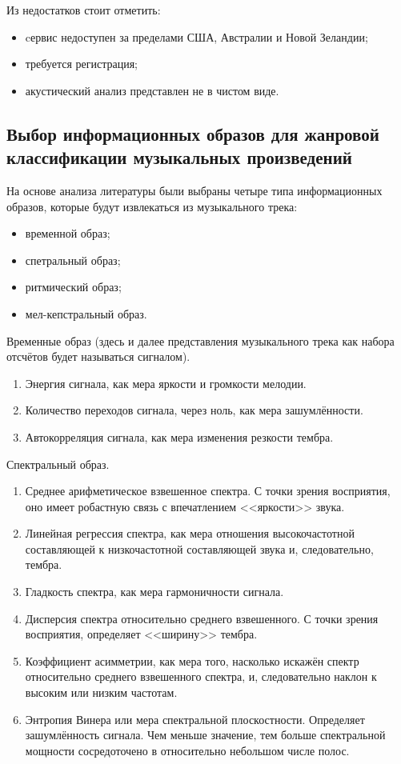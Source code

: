 Из недостатков стоит отметить:
\begin{itemize}
\item cервис недоступен за пределами США, Австралии и Новой Зеландии;
\item требуется регистрация;
\item акустический анализ представлен не в чистом виде.
\end{itemize}



\subsection{Выбор информационных образов для жанровой классификации музыкальных произведений}
\label{sub:domain:feature_selection}
На основе анализа литературы были выбраны четыре типа информационных образов, которые будут извлекаться из музыкального трека:
\begin{itemize}
\item временной образ;
\item спетральный образ;
\item ритмический образ;
\item мел-кепстральный образ.
\end{itemize}

Временные образ (здесь и далее представления музыкального трека как набора отсчётов будет называться сигналом).

\begin{enumerate}[label=\arabic*.]
\item Энергия сигнала, как мера яркости и громкости мелодии.
\item Количество переходов сигнала, через ноль, как мера зашумлённости.
\item Автокорреляция сигнала, как мера изменения резкости тембра.
\end{enumerate}

Спектральный образ.

\begin{enumerate}[label=\arabic*.]
\item Среднее арифметическое взвешенное спектра. С точки зрения восприятия, оно имеет робастную связь с впечатлением <<яркости>> звука.
\item Линейная регрессия спектра, как мера отношения высокочастотной составляющей к низкочастотной составляющей звука и, следовательно, тембра.
\item Гладкость спектра, как мера гармоничности сигнала.
\item Дисперсия спектра относительно среднего взвешенного. С точки зрения восприятия, определяет <<ширину>> тембра.
\item Коэффициент асимметрии, как мера того, насколько искажён спектр относительно среднего взвешенного спектра, и, следовательно наклон к высоким или низким частотам.
\item Энтропия Винера или мера спектральной плоскостности. Определяет зашумлённость сигнала. Чем меньше значение, тем больше спектральной мощности сосредоточено в относительно небольшом числе полос.
\end{enumerate}

